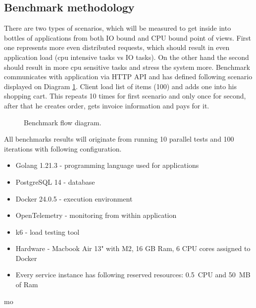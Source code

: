 



\subsection{Benchmark methodology}
There are two types of scenarios, which will be measured to get inside into bottles of applications from both IO bound and CPU bound point of views. First one represents more even distributed requests, which should result in even application load (cpu intensive tasks vs IO tasks).
On the other hand the second should result in more cpu sensitive tasks and stress the system more.
Benchmark communicates with application via HTTP API and has defined following scenario displayed on Diagram \ref{img:benchmark_flow}.
Client load list of items (100) and adds one into his shopping cart. This repeats 10 times for first scenario and only once for second, after that he creates order, gets invoice information and pays for it.

\begin{figure}
    \centering
    
    \caption{Benchmark flow diagram. \label{img:benchmark_flow}}
\end{figure}

All benchmarks results will originate from running 10 parallel tests and 100 iterations with following configuration.
\begin{itemize}
    \item Golang 1.21.3 - programming language used for applications
    \item PostgreSQL 14 - database
    \item Docker 24.0.5 - execution environment
    \item OpenTelemetry - monitoring from within application
    \item k6 - load testing tool
    \item Hardware - Macbook Air 13" with M2, 16 GB Ram, 6 CPU cores assigned to Docker
    \item Every service instance has following reserved resources: 0.5~CPU and 50~MB of Ram
\end{itemize}mo

